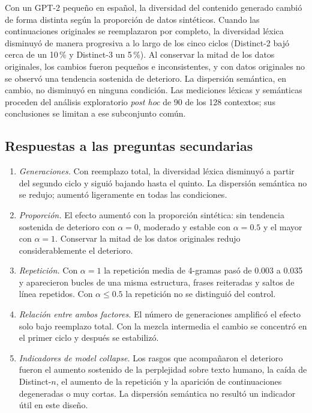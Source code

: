 \documentclass[12pt,letterpaper]{article}
\begin{document}
Con un GPT-2 pequeño en español, la diversidad del contenido generado
cambió de forma distinta según la proporción de datos sintéticos. Cuando
las continuaciones originales se reemplazaron por completo, la diversidad
léxica disminuyó de manera progresiva a lo largo de los cinco ciclos
(Distinct-2 bajó cerca de un 10\,\% y Distinct-3 un 5\,\%). Al conservar
la mitad de los datos originales, los cambios fueron pequeños e
inconsistentes, y con datos originales no se observó una tendencia
sostenida de deterioro. La dispersión semántica, en cambio, no disminuyó
en ninguna condición. Las mediciones léxicas y semánticas proceden del
análisis exploratorio \textit{post hoc} de 90 de los 128 contextos; sus
conclusiones se limitan a ese subconjunto común.

\subsection{Respuestas a las preguntas secundarias}

\begin{enumerate}
    \item \textit{Generaciones.} Con reemplazo total, la diversidad léxica
    disminuyó a partir del segundo ciclo y siguió bajando hasta el quinto.
    La dispersión semántica no se redujo; aumentó ligeramente en todas las
    condiciones.
    \item \textit{Proporción.} El efecto aumentó con la proporción
    sintética: sin tendencia sostenida de deterioro con \(\alpha=0\), moderado y estable con
    \(\alpha=0.5\) y el mayor con \(\alpha=1\). Conservar la mitad de los
    datos originales redujo considerablemente el deterioro.
    \item \textit{Repetición.} Con \(\alpha=1\) la repetición media de
    4-gramas pasó de 0.003 a 0.035 y aparecieron bucles de una misma
    estructura, frases reiteradas y saltos de línea repetidos. Con
    \(\alpha\le0.5\) la repetición no se distinguió del control.
    \item \textit{Relación entre ambos factores.} El número de
    generaciones amplificó el efecto solo bajo reemplazo total. Con la
    mezcla intermedia el cambio se concentró en el primer ciclo y después
    se estabilizó.
    \item \textit{Indicadores de model collapse.} Los rasgos que
    acompañaron el deterioro fueron el aumento sostenido de la perplejidad
    sobre texto humano, la caída de Distinct-\(n\), el aumento de la
    repetición y la aparición de continuaciones degeneradas o muy cortas.
    La dispersión semántica no resultó un indicador útil en este diseño.
\end{enumerate}
\end{document}
